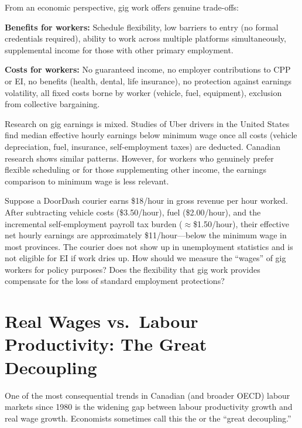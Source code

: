 From an economic perspective, gig work offers genuine trade-offs:

\textbf{Benefits for workers:} Schedule flexibility, low barriers to entry (no formal credentials required), ability to work across multiple platforms simultaneously, supplemental income for those with other primary employment.

\textbf{Costs for workers:} No guaranteed income, no employer contributions to CPP or EI, no benefits (health, dental, life insurance), no protection against earnings volatility, all fixed costs borne by worker (vehicle, fuel, equipment), exclusion from collective bargaining.

Research on gig earnings is mixed. Studies of Uber drivers in the United States find median effective hourly earnings below minimum wage once all costs (vehicle depreciation, fuel, insurance, self-employment taxes) are deducted. Canadian research shows similar patterns. However, for workers who genuinely prefer flexible scheduling or for those supplementing other income, the earnings comparison to minimum wage is less relevant.

\begin{thinkbox}
Suppose a DoorDash courier earns \$18/hour in gross revenue per hour worked. After subtracting vehicle costs (\$3.50/hour), fuel (\$2.00/hour), and the incremental self-employment payroll tax burden ($\approx$\$1.50/hour), their effective net hourly earnings are approximately \$11/hour---below the minimum wage in most provinces. The courier does not show up in unemployment statistics and is not eligible for EI if work dries up. How should we measure the ``wages'' of gig workers for policy purposes? Does the flexibility that gig work provides compensate for the loss of standard employment protections?
\end{thinkbox}

\section{Real Wages vs.\ Labour Productivity: The Great Decoupling}

One of the most consequential trends in Canadian (and broader OECD) labour markets since 1980 is the widening gap between labour productivity growth and real wage growth. Economists sometimes call this the  or the ``great decoupling.''

